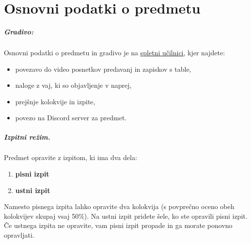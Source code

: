 \chapter{Osnovni podatki o predmetu}

\paragraph{Gradivo:}
%
Osnovni podatki o predmetu in gradivo je na \href{https://ucilnica.fmf.uni-lj.si/}{spletni učilnici}, kjer najdete:
\begin{itemize}
\item povezavo do video posnetkov predavanj in zapiskov s table,
\item naloge z vaj, ki so objavljenje v naprej,
\item prejšnje kolokvije in izpite,
\item povezo na Discord server za predmet.
\end{itemize}

\paragraph{Izpitni režim.}
%
Predmet opravite z izpitom, ki ima dva dela:
%
\begin{enumerate}
\item \textbf{pisni izpit}
\item \textbf{ustni izpit}
\end{enumerate}
%
Namesto pisnega izpita lahko opravite dva kolokvija (s povprečno oceno obeh kolokvijev skupaj vsaj 50\%). Na ustni izpit pridete šele, ko ste opravili pisni izpit. Če ustnega izpita ne opravite, vam pisni izpit propade in ga
morate ponovno opravljati.
